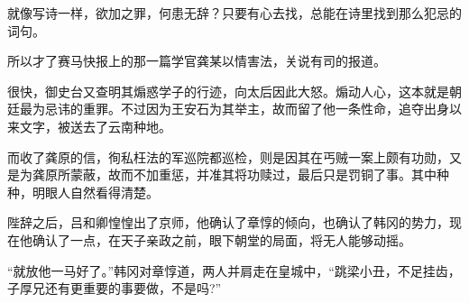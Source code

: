 就像写诗一样，欲加之罪，何患无辞？只要有心去找，总能在诗里找到那么犯忌的词句。

所以才了赛马快报上的那一篇学官龚某以情害法，关说有司的报道。

很快，御史台又查明其煽惑学子的行迹，向太后因此大怒。煽动人心，这本就是朝廷最为忌讳的重罪。不过因为王安石为其举主，故而留了他一条性命，追夺出身以来文字，被送去了云南种地。

而收了龚原的信，徇私枉法的军巡院都巡检，则是因其在丐贼一案上颇有功勋，又是为龚原所蒙蔽，故而不加重惩，并准其将功赎过，最后只是罚铜了事。其中种种，明眼人自然看得清楚。

陛辞之后，吕和卿惶惶出了京师，他确认了章惇的倾向，也确认了韩冈的势力，现在他确认了一点，在天子亲政之前，眼下朝堂的局面，将无人能够动摇。

“就放他一马好了。”韩冈对章惇道，两人并肩走在皇城中，“跳梁小丑，不足挂齿，子厚兄还有更重要的事要做，不是吗?”
